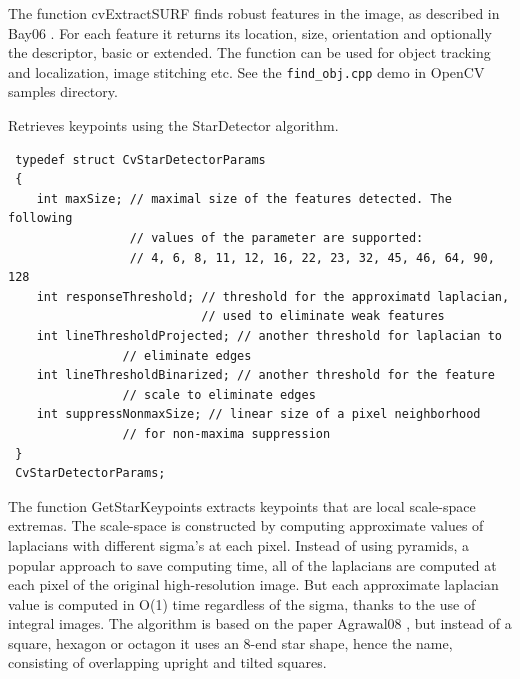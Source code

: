 The function cvExtractSURF finds robust features in the image, as
described in
Bay06
. For each feature it returns its location, size,
orientation and optionally the descriptor, basic or extended. The function
can be used for object tracking and localization, image stitching etc. See the
\texttt{find\_obj.cpp} demo in OpenCV samples directory.

\label{GetStarKeypoints}

Retrieves keypoints using the StarDetector algorithm.


\begin{description}
\begin{lstlisting}
 typedef struct CvStarDetectorParams
 {
    int maxSize; // maximal size of the features detected. The following 
                 // values of the parameter are supported:
                 // 4, 6, 8, 11, 12, 16, 22, 23, 32, 45, 46, 64, 90, 128
    int responseThreshold; // threshold for the approximatd laplacian,
                           // used to eliminate weak features
    int lineThresholdProjected; // another threshold for laplacian to 
				// eliminate edges
    int lineThresholdBinarized; // another threshold for the feature 
				// scale to eliminate edges
    int suppressNonmaxSize; // linear size of a pixel neighborhood 
			    // for non-maxima suppression
 }
 CvStarDetectorParams;
\end{lstlisting}
\end{description}

The function GetStarKeypoints extracts keypoints that are local
scale-space extremas. The scale-space is constructed by computing
approximate values of laplacians with different sigma's at each
pixel. Instead of using pyramids, a popular approach to save computing
time, all of the laplacians are computed at each pixel of the original
high-resolution image. But each approximate laplacian value is computed
in O(1) time regardless of the sigma, thanks to the use of integral
images. The algorithm is based on the paper 
Agrawal08
, but instead
of a square, hexagon or octagon it uses an 8-end star shape, hence the name,
consisting of overlapping upright and tilted squares.

